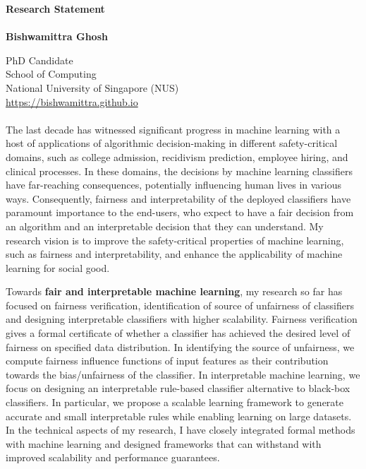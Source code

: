 \documentclass[11pt]{article}
\begin{document}
	\noindent\huge \textbf{Research Statement} \\
	\vspace{0.1em}\\
	\Large \textbf{Bishwamittra Ghosh}
		
	\normalsize
	\noindent PhD Candidate\\
	School of Computing\\
	National University of Singapore (NUS)\\
	\url{https://bishwamittra.github.io}



	\paragraph{}
	The last decade has witnessed significant progress in machine learning with a host of applications of algorithmic decision-making in different safety-critical domains, such as college admission, recidivism prediction, employee hiring, and clinical processes. In these domains, the decisions by machine learning classifiers have far-reaching consequences, potentially influencing human lives in various ways. Consequently, fairness and interpretability of the deployed classifiers have paramount importance to the end-users, who expect to have a fair decision from an algorithm and an interpretable decision that they can understand. My research vision is to improve the safety-critical properties of machine learning, such as fairness and interpretability, and enhance the applicability of machine learning for social good. 
	
	
	Towards \textbf{fair and interpretable machine learning}, my research so far has focused on fairness verification, identification of source of unfairness of classifiers and designing interpretable classifiers with higher scalability. Fairness verification gives a formal certificate of whether a classifier has achieved the desired level of fairness on specified data distribution. In identifying the source of unfairness, we compute fairness influence functions of input features as their contribution towards the bias/unfairness of the classifier. In interpretable machine learning, we focus on designing an interpretable rule-based classifier alternative to black-box classifiers. In particular, we propose a scalable learning framework to generate accurate and small interpretable rules while enabling learning on large datasets. In the technical aspects of my research, I have closely integrated formal methods with machine learning and designed frameworks that can withstand with improved scalability and performance guarantees.
	
\end{document}
